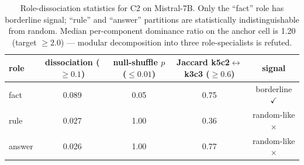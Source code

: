 
\begin{table}[t]
\centering
\caption{Role-dissociation statistics for C2 on Mistral-7B. Only the ``fact'' role has borderline signal; ``rule'' and ``answer'' partitions are statistically indistinguishable from random. Median per-component dominance ratio on the anchor cell is 1.20 (target $\geq 2.0$) — modular decomposition into three role-specialists is refuted.}
\label{tab:c2_role_dissociation}
\begin{tabular}{lcccc}
\toprule
role & dissociation ($\geq 0.1$) & null-shuffle $p$ ($\leq 0.01$) & Jaccard k5c2$\leftrightarrow$k3c3 ($\geq 0.6$) & signal \\
\midrule
fact & 0.089 & 0.05 & 0.75 & borderline $\checkmark$ \\
rule & 0.027 & 1.00 & 0.36 & random-like $\times$ \\
answer & 0.026 & 1.00 & 0.77 & random-like $\times$ \\
\bottomrule
\end{tabular}
\end{table}
